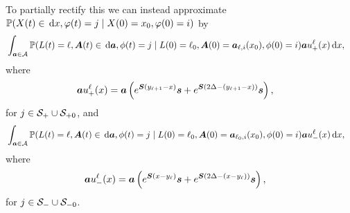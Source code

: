 
To partially rectify this we can instead approximate \(\mathbb P(X(t)\in \, \mathrm{d} x  , \varphi(t) = j\mid X(0)=x_0, \varphi(0) = i) \) by
\begin{align}
	\label{eqn: density approx 3+}&
		\displaystyle\int_{\boldsymbol a \in\mathcal A}\mathbb P(L(t) = \ell, \boldsymbol A(t)\in\, \mathrm{d} \boldsymbol a,\phi(t) = j\mid L(0)=\ell_0, \boldsymbol A(0) = \boldsymbol  a_{\ell,i}(x_0), \phi(0) = i) \boldsymbol a u_+^\ell(x) \, \mathrm{d} x ,
\end{align}
{where}
\begin{align}
		&\boldsymbol a u_+^\ell(x) = \boldsymbol a \left(e^{ \boldsymbol{S}(y_{\ell+1}-x)} \boldsymbol s + e^{ \boldsymbol{S}(2\Delta-(y_{\ell+1}-x))} \boldsymbol s\right),
\end{align}
{for \(j\in\mathcal S_+\cup \mathcal{S}_{+0}\), and }
\begin{align}
	\label{eqn: density approx 3-}& 
		\displaystyle\int_{\boldsymbol a \in\mathcal A}\mathbb P(L(t) = \ell, \boldsymbol A(t)\in\, \mathrm{d} \boldsymbol a,\phi(t) = j\mid L(0)=\ell_0, \boldsymbol A(0) = \boldsymbol  a_{\ell_0,i}(x_0), \phi(0) = i) \boldsymbol a u_-^\ell(x) \, \mathrm{d} x ,
\end{align}
{where}
\begin{align}
		&\boldsymbol a u_-^\ell(x) = \boldsymbol a \left(e^{ \boldsymbol{S}(x-y_\ell)} \boldsymbol s+e^{ \boldsymbol{S}(2\Delta-(x-y_\ell))} \boldsymbol s\right),
\end{align}
for \(j\in\mathcal S_-\cup \mathcal{S}_{-0}\). 

